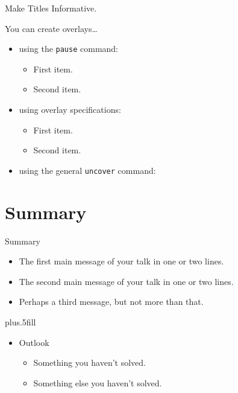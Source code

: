 \documentclass[handout]{beamer} 	%
\begin{document}
\begin{frame}{Make Titles Informative.}

  You can create overlays\dots
  \begin{itemize}
  \item using the \texttt{pause} command:
    \begin{itemize}
    \item
      First item.
      \pause
    \item    
      Second item.
    \end{itemize}
  \item
    using overlay specifications:
    \begin{itemize}
    \item<3->
      First item.
    \item<4->
      Second item.
    \end{itemize}
  \item
    using the general \texttt{uncover} command:
    \begin{itemize}
    \end{itemize}
  \end{itemize}
\end{frame}



\section*{Summary}


\begin{frame}{Summary}

  \begin{itemize}
  \item
    The \alert{first main message} of your talk in one or two lines.
  \item
    The \alert{second main message} of your talk in one or two lines.
  \item
    Perhaps a \alert{third message}, but not more than that.
  \end{itemize}
  
  \vskip0pt plus.5fill
  \begin{itemize}
  \item
    Outlook
    \begin{itemize}
    \item
      Something you haven't solved.
    \item
      Something else you haven't solved.
    \end{itemize}
  \end{itemize}
\end{frame}


\end{document}
